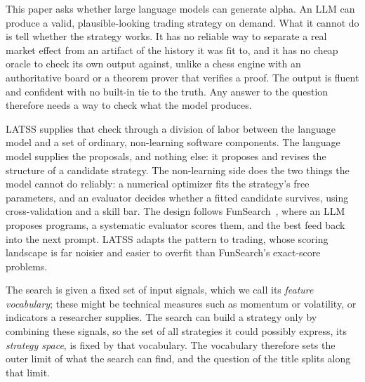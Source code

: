 \documentclass[11pt]{article}
\begin{document}
This paper asks whether large language models can generate alpha. An LLM can produce a valid,
plausible-looking trading strategy on demand. What it cannot do is tell whether the strategy works. It
has no reliable way to separate a real market effect from an artifact of the history it was fit to, and
it has no cheap oracle to check its own output against, unlike a chess engine with an authoritative board
or a theorem prover that verifies a proof. The output is fluent and confident with no built-in tie to the
truth. Any answer to the question therefore needs a way to check what the model produces.

LATSS supplies that check through a division of labor between the language model and a set of ordinary,
non-learning software components. The language model supplies the proposals, and nothing else: it
proposes and revises the structure of a candidate strategy. The non-learning side does the two things
the model cannot do reliably: a numerical optimizer fits the strategy's free parameters, and an
evaluator decides whether a fitted candidate survives, using cross-validation and a skill bar. The design
follows FunSearch~\cite{funsearch}, where an LLM proposes programs, a systematic evaluator scores them,
and the best feed back into the next prompt. LATSS adapts the pattern to trading, whose scoring landscape
is far noisier and easier to overfit than FunSearch's exact-score problems.

The search is given a fixed set of input signals, which we call its \emph{feature vocabulary}; these
might be technical measures such as momentum or volatility, or indicators a researcher supplies. The
search can build a strategy only by combining these signals, so the set of all strategies it could
possibly express, its \emph{strategy space}, is fixed by that vocabulary. The vocabulary therefore sets
the outer limit of what the search can find, and the question of the title splits along that limit.
\end{document}
